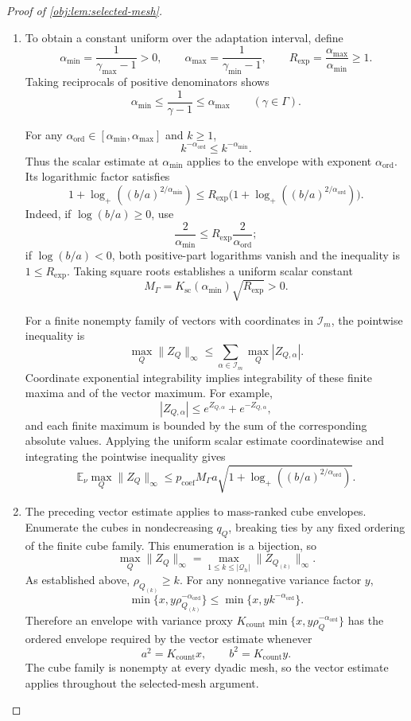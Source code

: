 \begin{proof}[Proof of \cref{obj:lem:selected-mesh}]
\begin{enumerate}
\item To obtain a constant uniform over the adaptation interval, define
\[
\alpha_{\min}=\frac1{\gamma_{\max}-1}>0,\qquad
\alpha_{\max}=\frac1{\gamma_{\min}-1},
\qquad
R_{\mathrm{exp}}=\frac{\alpha_{\max}}{\alpha_{\min}}\ge1.
\]
Taking reciprocals of positive denominators shows
\[
\alpha_{\min}\le\frac1{\gamma-1}\le\alpha_{\max}
\qquad(\gamma\in\Gamma).
\]

For any \(\alpha_{\mathrm{ord}}\in[\alpha_{\min},\alpha_{\max}]\) and
\(k\ge1\),
\[
k^{-\alpha_{\mathrm{ord}}}\le k^{-\alpha_{\min}}.
\]
Thus the scalar estimate at \(\alpha_{\min}\) applies to the envelope
with exponent \(\alpha_{\mathrm{ord}}\). Its logarithmic factor satisfies
\[
1+\log_+((b/a)^{2/\alpha_{\min}})
\le
R_{\mathrm{exp}}
\bigl(1+\log_+((b/a)^{2/\alpha_{\mathrm{ord}}})\bigr).
\]
Indeed, if \(\log(b/a)\ge0\), use
\[
\frac2{\alpha_{\min}}
\le R_{\mathrm{exp}}\frac2{\alpha_{\mathrm{ord}}};
\]
if \(\log(b/a)<0\), both positive-part logarithms vanish and the
inequality is \(1\le R_{\mathrm{exp}}\).
Taking square roots establishes a uniform scalar constant
\[
M_\Gamma
=
K_{\mathrm{sc}}(\alpha_{\min})\sqrt{R_{\mathrm{exp}}}>0.
\]

For a finite nonempty family of vectors with coordinates in
\(\mathcal I_m\), the pointwise inequality is
\[
\max_Q\|Z_Q\|_\infty
\le
\sum_{\alpha\in\mathcal I_m}\max_Q|Z_{Q,\alpha}|.
\]
Coordinate exponential integrability implies integrability of these
finite maxima and of the vector maximum. For example,
\[
|Z_{Q,\alpha}|
\le e^{Z_{Q,\alpha}}+e^{-Z_{Q,\alpha}},
\]
and each finite maximum is bounded by the sum of the corresponding
absolute values. Applying the uniform scalar estimate coordinatewise
and integrating the pointwise inequality gives
\[
\mathbb E_\nu\max_Q\|Z_Q\|_\infty
\le
p_{\mathrm{coef}}M_\Gamma a
\sqrt{1+\log_+((b/a)^{2/\alpha_{\mathrm{ord}}})}.
\]

\item The preceding vector estimate applies to mass-ranked cube
envelopes. Enumerate the cubes in nondecreasing \(q_Q\), breaking ties
by any fixed ordering of the finite cube family. This enumeration is a
bijection, so
\[
\max_Q\|Z_Q\|_\infty
=
\max_{1\le k\le|\mathcal Q_h|}\|Z_{Q_{(k)}}\|_\infty.
\]
As established above, \(\rho_{Q_{(k)}}\ge k\). For any nonnegative
variance factor \(y\),
\[
\min\{x,y\rho_{Q_{(k)}}^{-\alpha_{\mathrm{ord}}}\}
\le
\min\{x,yk^{-\alpha_{\mathrm{ord}}}\}.
\]
Therefore an envelope with variance proxy
\(K_{\mathrm{count}}\min\{x,y\rho_Q^{-\alpha_{\mathrm{ord}}}\}\)
has the ordered envelope required by the vector estimate whenever
\[
a^2=K_{\mathrm{count}}x,\qquad
b^2=K_{\mathrm{count}}y.
\]
The cube family is nonempty at every dyadic mesh, so the vector estimate
applies throughout the selected-mesh argument.


\end{enumerate}
\end{proof}

